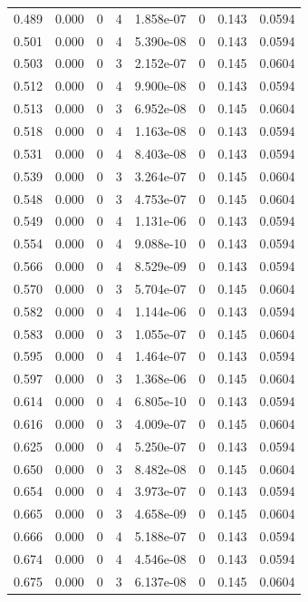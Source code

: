 \documentclass[preview]{standalone}
\begin{document}
{{{\begin{tabular}{L{1.2cm}C{1.2cm} C{0.3cm}C{0.5cm} C{1.4cm}C{1.4cm} C{1.4cm}C{1.4cm}}
  0.489  &  0.000  & 0     &  4 &  1.858e-07  & 0  & 0.143 &  0.0594   \\ 
  0.501  &  0.000  & 0     &  4 &  5.390e-08  & 0  & 0.143 &  0.0594   \\ 
  0.503  &  0.000  & 0     &  3 &  2.152e-07  & 0  & 0.145 &  0.0604   \\ 
  0.512  &  0.000  & 0     &  4 &  9.900e-08  & 0  & 0.143 &  0.0594   \\ 
  0.513  &  0.000  & 0     &  3 &  6.952e-08  & 0  & 0.145 &  0.0604   \\ 
  0.518  &  0.000  & 0     &  4 &  1.163e-08  & 0  & 0.143 &  0.0594   \\ 
  0.531  &  0.000  & 0     &  4 &  8.403e-08  & 0  & 0.143 &  0.0594   \\ 
  0.539  &  0.000  & 0     &  3 &  3.264e-07  & 0  & 0.145 &  0.0604   \\ 
  0.548  &  0.000  & 0     &  3 &  4.753e-07  & 0  & 0.145 &  0.0604   \\ 
  0.549  &  0.000  & 0     &  4 &  1.131e-06  & 0  & 0.143 &  0.0594   \\ 
  0.554  &  0.000  & 0     &  4 &  9.088e-10  & 0  & 0.143 &  0.0594   \\ 
  0.566  &  0.000  & 0     &  4 &  8.529e-09  & 0  & 0.143 &  0.0594   \\ 
  0.570  &  0.000  & 0     &  3 &  5.704e-07  & 0  & 0.145 &  0.0604   \\ 
  0.582  &  0.000  & 0     &  4 &  1.144e-06  & 0  & 0.143 &  0.0594   \\ 
  0.583  &  0.000  & 0     &  3 &  1.055e-07  & 0  & 0.145 &  0.0604   \\ 
  0.595  &  0.000  & 0     &  4 &  1.464e-07  & 0  & 0.143 &  0.0594   \\ 
  0.597  &  0.000  & 0     &  3 &  1.368e-06  & 0  & 0.145 &  0.0604   \\ 
  0.614  &  0.000  & 0     &  4 &  6.805e-10  & 0  & 0.143 &  0.0594   \\ 
  0.616  &  0.000  & 0     &  3 &  4.009e-07  & 0  & 0.145 &  0.0604   \\ 
  0.625  &  0.000  & 0     &  4 &  5.250e-07  & 0  & 0.143 &  0.0594   \\ 
  0.650  &  0.000  & 0     &  3 &  8.482e-08  & 0  & 0.145 &  0.0604   \\ 
  0.654  &  0.000  & 0     &  4 &  3.973e-07  & 0  & 0.143 &  0.0594   \\ 
  0.665  &  0.000  & 0     &  3 &  4.658e-09  & 0  & 0.145 &  0.0604   \\ 
  0.666  &  0.000  & 0     &  4 &  5.188e-07  & 0  & 0.143 &  0.0594   \\ 
  0.674  &  0.000  & 0     &  4 &  4.546e-08  & 0  & 0.143 &  0.0594   \\ 
  0.675  &  0.000  & 0     &  3 &  6.137e-08  & 0  & 0.145 &  0.0604   \\ 
\hline 
\end{tabular} 

}}}
\end{document}

